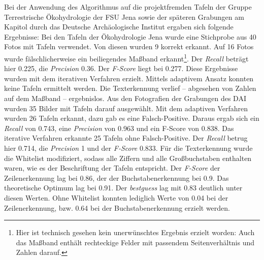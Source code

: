 Bei der Anwendung des Algorithmus auf die projektfremden Tafeln der Gruppe Terrestrische Ökohydrologie der FSU Jena sowie der späteren Grabungen am Kapitol durch das Deutsche Archäologische Institut ergaben sich folgende Ergebnisse:
Bei den Tafeln der Ökohydrologie Jena wurde eine Stichprobe aus 40 Fotos mit Tafeln verwendet. Von diesen wurden 9 korrekt erkannt. Auf 16 Fotos wurde fälschlicherweise ein beiliegendes Maßband erkannt\footnote{Hier ist technisch gesehen kein unerwünschtes Ergebnis erzielt worden: Auch das Maßband enthält rechteckige Felder mit passendem Seitenverhältnis und Zahlen darauf.}. Der \textit{Recall} beträgt hier 0.225, die \textit{Precision} 0.36. Der \textit{F-Score} liegt bei 0.277. Diese Ergebnisse wurden mit dem iterativen Verfahren erzielt. Mittels adaptivem Ansatz konnten keine Tafeln ermittelt werden. Die Texterkennung verlief -- abgesehen von Zahlen auf dem Maßband -- ergebnislos.
Aus den Fotografien der Grabungen des DAI wurden 35 Bilder mit Tafeln darauf ausgewählt. Mit dem adaptiven Verfahren wurden 26 Tafeln erkannt, dazu gab es eine Falsch-Positive. Daraus ergab sich ein \textit{Recall} von 0.743, eine \textit{Precision} von 0.963 und ein {F-Score} von 0.838. Das iterative Verfahren erkannte 25 Tafeln ohne Falsch-Positive. Der \textit{Recall} betrug hier 0.714, die \textit{Precision} 1 und der \textit{F-Score} 0.833.
Für die Texterkennung wurde die Whitelist modifiziert, sodass alle Ziffern und alle Großbuchstaben enthalten waren, wie es der Beschriftung der Tafeln entspricht. Der \textit{F-Score} der Zeilenerkennung lag bei 0.86, der der Buchstabenerkennung bei 0.9. Das theoretische Optimum lag bei 0.91. Der \textit{bestguess} lag mit 0.83 deutlich unter diesen Werten. Ohne Whitelist konnten lediglich Werte von 0.04 bei der Zeilenerkennung, bzw. 0.64 bei der Buchstabenerkennung erzielt werden.
